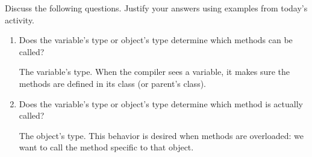 \Q \label{key3}
Discuss the following questions. Justify your answers using examples from today's activity.

\begin{enumerate}
\item Does the variable's type or object's type determine which methods can be called?

\begin{answer}[3em]
The variable's type.
When the compiler sees a variable, it makes sure the methods are defined in its class (or parent's class).
\end{answer}

\item Does the variable's type or object's type determine which method is actually called?

\begin{answer}[3em]
The object's type.
This behavior is desired when methods are overloaded: we want to call the method specific to that object.
\end{answer}
\end{enumerate}
